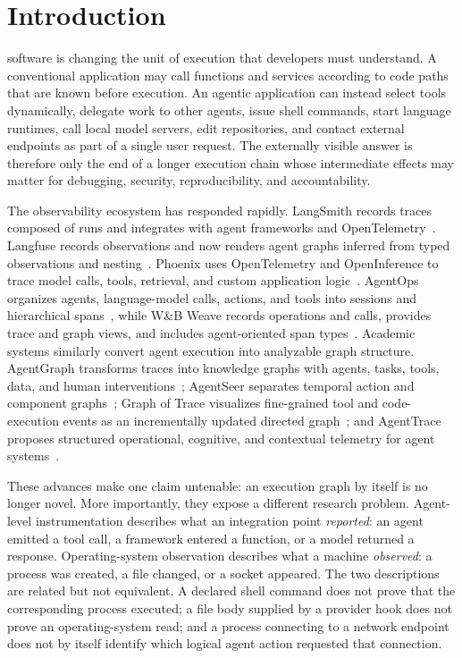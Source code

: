 \section{Introduction}
 software is changing the unit of execution that developers must understand. A conventional application may call functions and services according to code paths that are known before execution. An agentic application can instead select tools dynamically, delegate work to other agents, issue shell commands, start language runtimes, call local model servers, edit repositories, and contact external endpoints as part of a single user request. The externally visible answer is therefore only the end of a longer execution chain whose intermediate effects may matter for debugging, security, reproducibility, and accountability.

The observability ecosystem has responded rapidly. LangSmith records traces composed of runs and integrates with agent frameworks and OpenTelemetry~\cite{langsmith2026observability,langsmith2026otel}. Langfuse records observations and now renders agent graphs inferred from typed observations and nesting~\cite{langfuse2026agentgraphs,langfuse2026tracing}. Phoenix uses OpenTelemetry and OpenInference to trace model calls, tools, retrieval, and custom application logic~\cite{phoenix2026tracing,phoenix2026otel}. AgentOps organizes agents, language-model calls, actions, and tools into sessions and hierarchical spans~\cite{agentops2026,agentops2026core}, while W\&B Weave records operations and calls, provides trace and graph views, and includes agent-oriented span types~\cite{wandb2026tracing,wandb2026traceview}. Academic systems similarly convert agent execution into analyzable graph structure. AgentGraph transforms traces into knowledge graphs with agents, tasks, tools, data, and human interventions~\cite{wu2026agentgraph}; AgentSeer separates temporal action and component graphs~\cite{wicaksono2026agentseer}; Graph of Trace visualizes fine-grained tool and code-execution events as an incrementally updated directed graph~\cite{gao2026graphtrace}; and AgentTrace proposes structured operational, cognitive, and contextual telemetry for agent systems~\cite{alsayyad2026agenttrace}.

These advances make one claim untenable: an execution graph by itself is no longer novel. More importantly, they expose a different research problem. Agent-level instrumentation describes what an integration point \emph{reported}: an agent emitted a tool call, a framework entered a function, or a model returned a response. Operating-system observation describes what a machine \emph{observed}: a process was created, a file changed, or a socket appeared. The two descriptions are related but not equivalent. A declared shell command does not prove that the corresponding process executed; a file body supplied by a provider hook does not prove an operating-system read; and a process connecting to a network endpoint does not by itself identify which logical agent action requested that connection.


